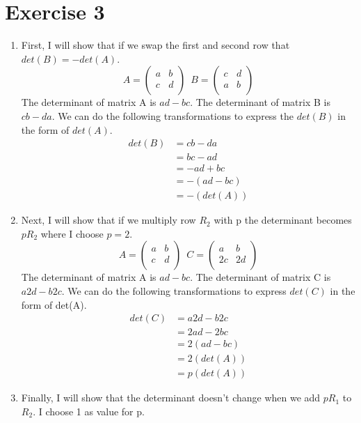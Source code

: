 \documentclass[a4paper]{article}
\begin{document}
\section*{Exercise 3}
\begin{enumerate}
  \item First, I will show that if we swap the first and second row that $det(B) = - det(A)$.
  \[
  A =
  \left(
  \begin{array}{cc}
  a & b \\
  c & d \\
  \end{array}
  \right)
  \enspace
  B =
  \left(
  \begin{array}{cc}
  c & d \\
  a & b \\
  \end{array}
  \right)
  \]
  The determinant of matrix A is $ad - bc$. The determinant of matrix B is $cb - da$. We can do the following transformations to express the $det(B)$ in the form of $det(A)$.
  \begin{align*}
    det(B) &= cb - da \\
    &= bc - ad \\
    &= - ad + bc \\
    &= - (ad - bc) \\
    &= - (det(A))
  \end{align*}
\item Next, I will show that if we multiply row $R_2$ with p the determinant becomes $pR_2$ where I choose $p = 2$.
\[
A =
\left(
\begin{array}{cc}
a & b \\
c & d \\
\end{array}
\right)
\enspace
C =
\left(
\begin{array}{cc}
a & b \\
2c & 2d \\
\end{array}
\right)
\]
The determinant of matrix A is $ad - bc$. The determinant of matrix C is $a2d - b2c$. We can do the following transformations to express $det(C)$ in the form of det(A).
\begin{align*}
  det(C) &= a2d - b2c \\
  &= 2ad - 2bc \\
  &= 2(ad - bc) \\
  &= 2(det(A)) \\
  &= p(det(A))
\end{align*}
\item Finally, I will show that the determinant doesn't change when we add $pR_1$ to $R_2$. I choose 1 as value for p.

\end{enumerate}
\end{document}
